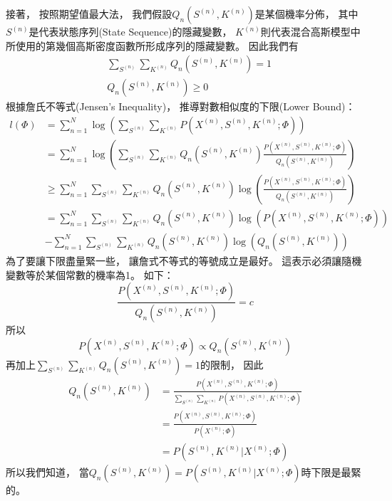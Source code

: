     接著，
    按照期望值最大法，
    我們假設$Q_n(S^{(n)}, K^{(n)})$是某個機率分佈，
    其中$S^{(n)}$是代表狀態序列(State Sequence)的隱藏變數，
    $K^{(n)}$則代表混合高斯模型中所使用的第幾個高斯密度函數所形成序列的隱藏變數。
    因此我們有
    \begin{align}
      &\sum_{S^{(n)}} \sum_{K^{(n)}} Q_n(S^{(n)}, K^{(n)}) = 1 \\
      &Q_n(S^{(n)}, K^{(n)}) \geq 0
    \end{align}
    根據詹氏不等式(Jensen's Inequality)，
    推導對數相似度的下限(Lower Bound)：
    \begin{equation}
      \begin{split}
	l(\Phi) 
	&= \sum_{n=1}^N \log \left( \sum_{S^{(n)}} \sum_{K^{(n)}} P(X^{(n)}, S^{(n)}, K^{(n)}; \Phi) \right) \\
	&= \sum_{n=1}^N \log \left( \sum_{S^{(n)}} \sum_{K^{(n)}} Q_n(S^{(n)}, K^{(n)}) \frac{P(X^{(n)}, S^{(n)}, K^{(n)}; \Phi)}{Q_n(S^{(n)}, K^{(n)})} \right) \\
	&\geq \sum_{n=1}^N \sum_{S^{(n)}} \sum_{K^{(n)}} Q_n(S^{(n)}, K^{(n)}) \log \left( \frac{P(X^{(n)}, S^{(n)}, K^{(n)}; \Phi)}{Q_n(S^{(n)}, K^{(n)})} \right) \\
	&= \sum_{n=1}^N \sum_{S^{(n)}} \sum_{K^{(n)}} Q_n(S^{(n)}, K^{(n)}) \log \left( P(X^{(n)}, S^{(n)}, K^{(n)}; \Phi) \right) \\
	&- \sum_{n=1}^N \sum_{S^{(n)}} \sum_{K^{(n)}} Q_n(S^{(n)}, K^{(n)}) \log \left( Q_n(S^{(n)}, K^{(n)}) \right) 
	\label{eq:jensen_lower_bound}
      \end{split}
    \end{equation}
    為了要讓下限盡量緊一些，
    讓詹式不等式的等號成立是最好。
    這表示必須讓隨機變數等於某個常數的機率為1。
    如下：
    \begin{equation}
	\frac{P(X^{(n)}, S^{(n)}, K^{(n)}; \Phi)}{Q_n(S^{(n)}, K^{(n)})} = c
    \end{equation}
    所以
    \begin{equation}
	P(X^{(n)}, S^{(n)}, K^{(n)}; \Phi) \propto Q_n(S^{(n)}, K^{(n)})
    \end{equation}
    再加上$\sum_{S^{(n)}} \sum_{K^{(n)}} Q_n(S^{(n)}, K^{(n)}) = 1$的限制，
    因此
    \begin{equation}
      \begin{split}
	Q_n(S^{(n)}, K^{(n)})
	&= \frac{P(X^{(n)}, S^{(n)}, K^{(n)}; \Phi)}{\sum_{S^{(n)}} \sum_{K^{(n)}} P(X^{(n)}, S^{(n)}, K^{(n)}; \Phi)} \\
	&= \frac{P(X^{(n)}, S^{(n)}, K^{(n)}; \Phi)}{P(X^{(n)}; \Phi)} \\
	&= P(S^{(n)}, K^{(n)} | X^{(n)}; \Phi) 
      \end{split}
    \end{equation}
    所以我們知道，
    當$Q_n(S^{(n)}, K^{(n)}) = P(S^{(n)}, K^{(n)} | X^{(n)}; \Phi)$時下限是最緊的。


